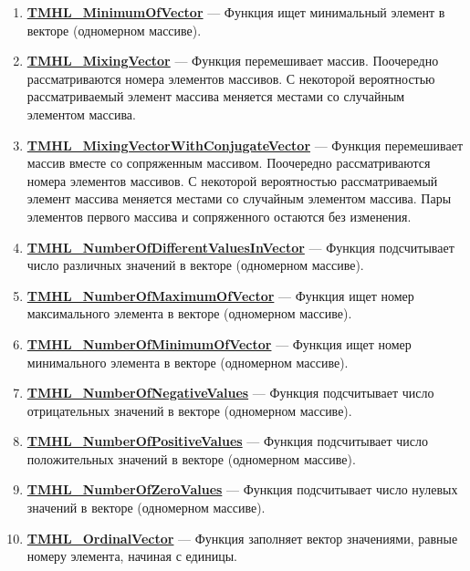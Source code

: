 \documentclass[a4paper,12pt]{article}
\begin{document}
\begin{enumerate}
\item \textbf{\hyperref[TMHL_MinimumOfVector]{TMHL\_MinimumOfVector}} --- Функция ищет минимальный элемент в векторе (одномерном массиве).

\item \textbf{\hyperref[TMHL_MixingVector]{TMHL\_MixingVector}} --- Функция перемешивает массив. Поочередно рассматриваются номера элементов массивов. С некоторой вероятностью рассматриваемый элемент массива меняется местами со случайным элементом массива.

\item \textbf{\hyperref[TMHL_MixingVectorWithConjugateVector]{TMHL\_MixingVectorWithConjugateVector}} --- Функция перемешивает массив вместе со сопряженным массивом. Поочередно рассматриваются номера элементов массивов. С некоторой вероятностью рассматриваемый элемент массива меняется местами со случайным элементом массива. Пары элементов первого массива и сопряженного остаются без изменения.

\item \textbf{\hyperref[TMHL_NumberOfDifferentValuesInVector]{TMHL\_NumberOfDifferentValuesInVector}} --- Функция подсчитывает число различных значений в векторе (одномерном массиве).

\item \textbf{\hyperref[TMHL_NumberOfMaximumOfVector]{TMHL\_NumberOfMaximumOfVector}} --- Функция ищет номер максимального элемента в векторе (одномерном массиве).

\item \textbf{\hyperref[TMHL_NumberOfMinimumOfVector]{TMHL\_NumberOfMinimumOfVector}} --- Функция ищет номер минимального элемента в векторе (одномерном массиве).

\item \textbf{\hyperref[TMHL_NumberOfNegativeValues]{TMHL\_NumberOfNegativeValues}} --- Функция подсчитывает число отрицательных значений в векторе (одномерном массиве).

\item \textbf{\hyperref[TMHL_NumberOfPositiveValues]{TMHL\_NumberOfPositiveValues}} --- Функция подсчитывает число положительных значений в векторе (одномерном массиве).

\item \textbf{\hyperref[TMHL_NumberOfZeroValues]{TMHL\_NumberOfZeroValues}} --- Функция подсчитывает число нулевых значений в векторе (одномерном массиве).

\item \textbf{\hyperref[TMHL_OrdinalVector]{TMHL\_OrdinalVector}} --- Функция заполняет вектор значениями, равные номеру элемента, начиная с единицы.


\end{enumerate}
\end{document}
